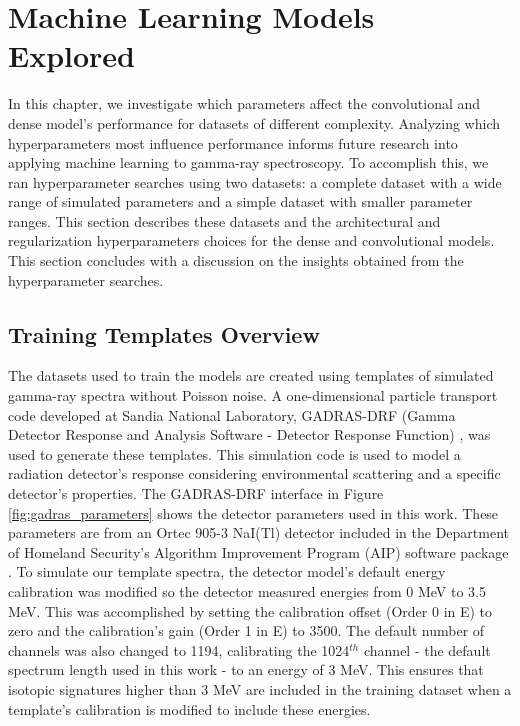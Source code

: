 \chapter{Machine Learning Models Explored} \label{ChapterMachineLearningModelsExplored}

In this chapter, we investigate which parameters affect the convolutional and dense model's performance for datasets of different complexity. Analyzing which hyperparameters most influence performance informs future research into applying machine learning to gamma-ray spectroscopy. To accomplish this, we ran hyperparameter searches using two datasets: a complete dataset with a wide range of simulated parameters and a simple dataset with smaller parameter ranges. This section describes these datasets and the architectural and regularization hyperparameters choices for the dense and convolutional models. This section concludes with a discussion on the insights obtained from the hyperparameter searches.



\section{Training Templates Overview}

The datasets used to train the models are created using templates of simulated gamma-ray spectra without Poisson noise. A one-dimensional particle transport code developed at Sandia National Laboratory, GADRAS-DRF (Gamma Detector Response and Analysis Software - Detector Response Function) \cite{mitchell2014}, was used to generate these templates. This simulation code is used to model a radiation detector's response considering environmental scattering and a specific  detector's properties. The GADRAS-DRF interface in Figure \ref{fig:gadras_parameters} shows the detector parameters used in this work. These parameters are from an Ortec 905-3 NaI(Tl) detector included in the Department of Homeland Security's Algorithm Improvement Program (AIP) software package \cite{DHSAIP}. To simulate our template spectra, the detector model's default energy calibration was modified so the detector measured energies from 0 MeV to 3.5 MeV. This was accomplished by setting the calibration offset (Order 0 in E) to zero and the calibration's gain (Order 1 in E) to 3500. The default number of channels was also changed to 1194, calibrating the 1024$^{th}$ channel - the default spectrum length used in this work - to an energy of 3 MeV. This ensures that isotopic signatures higher than 3 MeV are included in the training dataset when a template's calibration is modified to include these energies.

